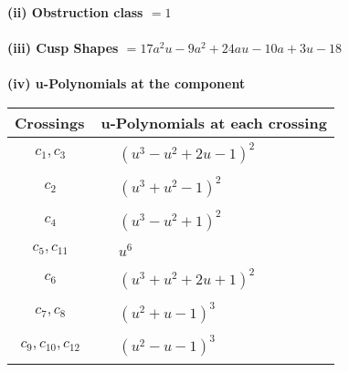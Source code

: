 \documentclass[1p]{elsarticle_modified}
\theoremstyle{definition}
\begin{document}
\flushleft \textbf{(ii) Obstruction class $= 1$}\\~\\
\flushleft \textbf{(iii) Cusp Shapes $= 17 a^2 u-9 a^2+24 a u-10 a+3 u-18$}\\~\\
\newpage\renewcommand{\arraystretch}{1}
\flushleft \textbf{(iv) u-Polynomials at the component}\newline \\
\begin{tabular}{m{50pt}|m{274pt}}
Crossings & \hspace{64pt}u-Polynomials at each crossing \\
\hline $$\begin{aligned}c_{1},c_{3}\end{aligned}$$&$\begin{aligned}
&(u^3- u^2+2 u-1)^2
\end{aligned}$\\
\hline $$\begin{aligned}c_{2}\end{aligned}$$&$\begin{aligned}
&(u^3+u^2-1)^2
\end{aligned}$\\
\hline $$\begin{aligned}c_{4}\end{aligned}$$&$\begin{aligned}
&(u^3- u^2+1)^2
\end{aligned}$\\
\hline $$\begin{aligned}c_{5},c_{11}\end{aligned}$$&$\begin{aligned}
&u^6
\end{aligned}$\\
\hline $$\begin{aligned}c_{6}\end{aligned}$$&$\begin{aligned}
&(u^3+u^2+2 u+1)^2
\end{aligned}$\\
\hline $$\begin{aligned}c_{7},c_{8}\end{aligned}$$&$\begin{aligned}
&(u^2+u-1)^3
\end{aligned}$\\
\hline $$\begin{aligned}c_{9},c_{10},c_{12}\end{aligned}$$&$\begin{aligned}
&(u^2- u-1)^3
\end{aligned}$\\
\hline
\end{tabular}\\~\\
\end{document}

